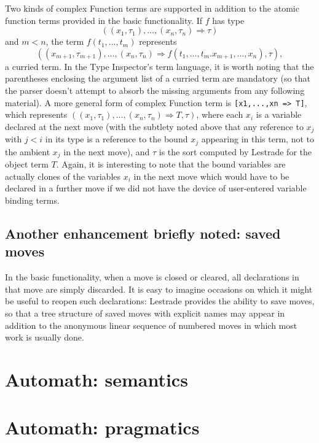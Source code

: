 \documentclass{article}
\begin{document}
Two kinds of complex Function terms are supported in addition to the atomic function terms provided in the basic functionality.  If $f$ has
type $$((x_1,\tau_1),\ldots,(x_n,\tau_n) \Rightarrow \tau)$$ and $m<n$, the term $f(t_1,\ldots,t_m)$ represents
$$((x_{m+1},\tau_{m+1}),\ldots,(x_n,\tau_n) \Rightarrow f(t_1,\ldots,t_m.x_{m+1},\ldots,x_n),\tau),$$ a curried term.  In the Type Inspector's term language, it is worth noting that the parentheses enclosing the argument list of a curried term are mandatory (so that the parser doesn't attempt to absorb the missing arguments from any following material).  A more general form of complex Function term is {\tt [x1,...,xn => T]}, which represents
$((x_1,\tau_1),\ldots,(x_n,\tau_n) \Rightarrow T,\tau)$, where each $x_i$ is a variable declared at the next move (with the subtlety noted above that
any reference to $x_j$ with $j<i$ in its type is a reference to the bound $x_j$ appearing in this term, not to the ambient $x_j$ in the next move), and $\tau$ is the sort computed by Lestrade for the object term $T$.  Again, it is interesting to note that the bound variables are actually clones of the variables $x_i$ in the next move which would have to be declared in a further move if we did not have the device of user-entered variable binding terms.

\subsection{Another enhancement briefly noted:  saved moves}

In the basic functionality, when a move is closed or cleared, all declarations in that move are simply discarded.  It is easy to imagine occasions on which it might be useful to reopen such declarations:  Lestrade provides the ability to save moves, so that a tree structure of saved moves with explicit names may appear in addition to the anonymous linear sequence of numbered moves in which most work is usually done.  

\newpage


\section{Automath:  semantics}


\section{Automath:  pragmatics}
\end{document}

